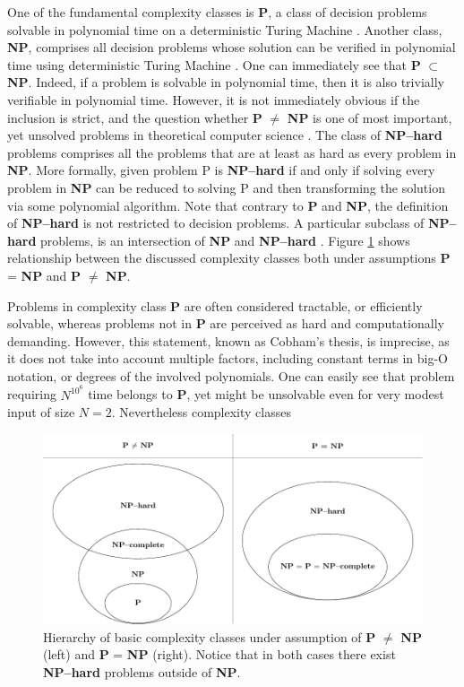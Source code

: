 One of the fundamental complexity classes is \textbf{P}, a class of decision problems solvable in polynomial time on a deterministic Turing Machine  \cite{arora}. Another class, \textbf{NP}, comprises all decision problems whose solution can be verified in polynomial time using deterministic Turing Machine \cite{arora}.
One can immediately see that \textbf{P} $\subset$ \textbf{NP}. Indeed, if a problem is solvable in polynomial time, then it is also trivially verifiable in polynomial time. However, it is not immediately obvious if the inclusion is strict, and the question whether \textbf{P} $\ne$ \textbf{NP} is one of most important, yet unsolved problems in theoretical computer science \cite{fortnow}.
The class of \textbf{NP--hard} problems comprises all the problems that are at least as hard as every problem in \textbf{NP}. More formally, given problem P is \textbf{NP--hard} if and only if solving every problem in \textbf{NP} can be reduced to solving P and then transforming the solution via some polynomial algorithm. Note that contrary to \textbf{P} and \textbf{NP},  the definition of \textbf{NP--hard} is not restricted to decision problems. A particular subclass of \textbf{NP--hard} problems, is an intersection of \textbf{NP} and \textbf{NP--hard} \cite{arora}. Figure \ref{fig:complexity} shows relationship between the discussed complexity classes both under assumptions \textbf{P} = \textbf{NP} and \textbf{P} $\ne$ \textbf{NP}.

Problems in complexity class \textbf{P} are often considered tractable, or efficiently solvable, whereas problems not in \textbf{P} are perceived as hard and computationally demanding. However, this statement, known as Cobham's thesis, is imprecise, as it does not take into account multiple factors, including constant terms in big-O notation, or degrees of the involved polynomials. One can easily see that problem requiring $N^{10^6}$ time belongs to \textbf{P}, yet might be unsolvable even for very modest input of size $N=2$. Nevertheless complexity classes

\begin{figure}
    \includegraphics[width=\textwidth]{figures/complexity_new.pdf}
    \caption{Hierarchy of basic complexity classes under assumption of \textbf{P} $\ne$ \textbf{NP} (left) and \textbf{P} = \textbf{NP} (right). Notice that in both cases there exist \textbf{NP--hard} problems outside of \textbf{NP}.}
    \label{fig:complexity}
\end{figure}


